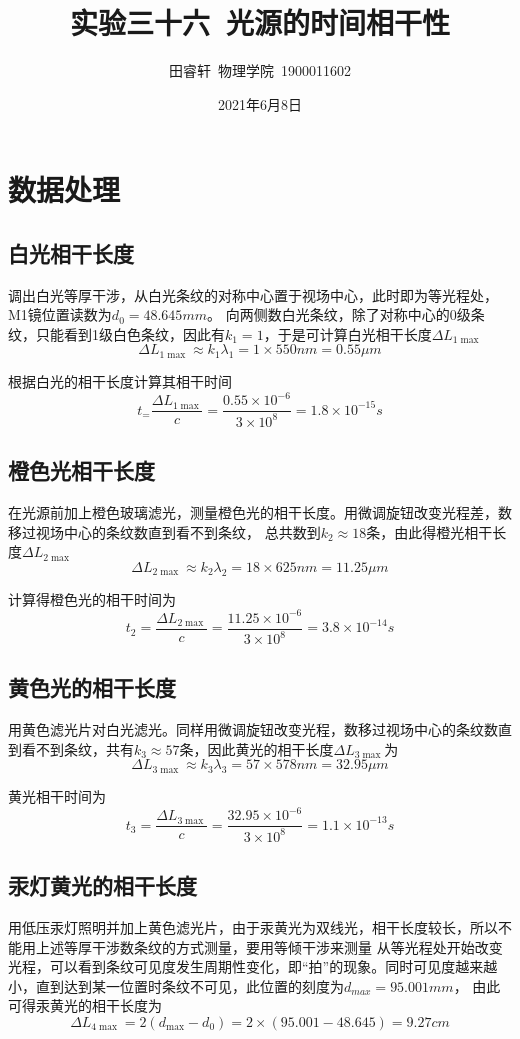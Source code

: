\documentclass{article}
\title{\heiti 实验三十六\ 光源的时间相干性}
\author{\kaishu 田睿轩\ 物理学院\ 1900011602}
\date{2021年6月8日}
\begin{document}
    \maketitle
    \section{数据处理}
    \subsection{白光相干长度}
    调出白光等厚干涉，从白光条纹的对称中心置于视场中心，此时即为等光程处，M1镜位置读数为$d_0=48.645mm$。
    向两侧数白光条纹，除了对称中心的0级条纹，只能看到1级白色条纹，因此有$k_1=1$，于是可计算白光相干长度$\Delta L_{1 \max }$
    $$\Delta L_{1 \max } \approx k_{1} \lambda_{1}=1\times 550nm=0.55\mu m$$

    根据白光的相干长度计算其相干时间
    $$t_=\frac{\Delta L_{1\max }}{c}=\frac{0.55\times 10^{-6}}{3\times 10^8}=1.8\times 10^{-15}s$$

    \subsection{橙色光相干长度}
    在光源前加上橙色玻璃滤光，测量橙色光的相干长度。用微调旋钮改变光程差，数移过视场中心的条纹数直到看不到条纹，
    总共数到$k_2\approx 18$条，由此得橙光相干长度$\Delta L_{2 \max }$
    $$\Delta L_{2 \max } \approx k_{2} \lambda_{2}=18\times 625nm=11.25\mu m$$

    计算得橙色光的相干时间为
    $$t_2=\frac{\Delta L_{2\max }}{c}=\frac{11.25\times 10^{-6}}{3\times 10^8}=3.8\times 10^{-14}s$$

    \subsection{黄色光的相干长度}
    用黄色滤光片对白光滤光。同样用微调旋钮改变光程，数移过视场中心的条纹数直到看不到条纹，共有$k_3\approx 57$条，因此黄光的相干长度$\Delta L_{3 \max }$为
    $$\Delta L_{3 \max } \approx k_{3} \lambda_{3}=57\times 578nm=32.95\mu m$$

    黄光相干时间为
    $$t_3=\frac{\Delta L_{3\max }}{c}=\frac{32.95\times 10^{-6}}{3\times 10^8}=1.1\times 10^{-13}s$$

    \subsection{汞灯黄光的相干长度}
    用低压汞灯照明并加上黄色滤光片，由于汞黄光为双线光，相干长度较长，所以不能用上述等厚干涉数条纹的方式测量，要用等倾干涉来测量
    从等光程处开始改变光程，可以看到条纹可见度发生周期性变化，即“拍”的现象。同时可见度越来越小，直到达到某一位置时条纹不可见，此位置的刻度为$d_{max}=95.001mm$，
    由此可得汞黄光的相干长度为
    $$\Delta L_{4 \max }=2 \left( d_{\max }-d_{0} \right)=2\times (95.001-48.645)=9.27cm$$
\end{document}
